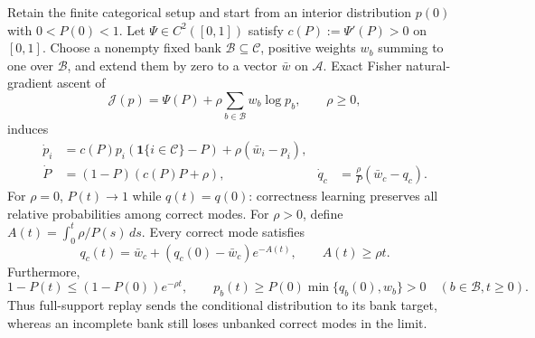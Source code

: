 \begin{theorem}
\label{ext:thm-natural-replay}
Retain the finite categorical setup and start from an interior distribution
$p(0)$ with $0<P(0)<1$. Let $\Psi\in C^2([0,1])$ satisfy
$c(P):=\Psi'(P)>0$ on $[0,1]$. Choose a nonempty fixed bank
$\mathcal B\subseteq\mathcal C$, positive weights $w_b$ summing to one over
$\mathcal B$, and extend them by zero to a vector $\bar w$ on
$\mathcal A$. Exact Fisher natural-gradient ascent of
\[
 \mathcal J(p)=\Psi(P)+\rho\sum_{b\in\mathcal B}w_b\log p_b,
 \qquad \rho\ge0,
\]
induces
\begin{align}
 \dot p_i&=c(P)p_i(\mathbf 1\{i\in\mathcal C\}-P)
                     +\rho(\bar w_i-p_i),
 \label{ext:eq-natural-p}\\
 \dot P&=(1-P)(c(P)P+\rho),
 &\dot q_c&=\frac{\rho}{P}(\bar w_c-q_c).
 \label{ext:eq-natural-Pq}
\end{align}
For $\rho=0$, $P(t)\to1$ while $q(t)=q(0)$: correctness learning preserves
all relative probabilities among correct modes. For $\rho>0$, define
$A(t)=\int_0^t\rho/P(s)\,ds$. Every correct mode satisfies
\begin{equation}
 q_c(t)=\bar w_c+(q_c(0)-\bar w_c)e^{-A(t)},
 \qquad A(t)\ge\rho t.
 \label{ext:eq-natural-conditional-solution}
\end{equation}
Furthermore,
\begin{equation}
 1-P(t)\le(1-P(0))e^{-\rho t},
 \qquad
 p_b(t)\ge P(0)\min\{q_b(0),w_b\}>0
 \quad (b\in\mathcal B,t\ge0).
 \label{ext:eq-natural-retention}
\end{equation}
Thus full-support replay sends the conditional distribution to its bank
target, whereas an incomplete bank still loses unbanked correct modes in the
limit.
\end{theorem}

